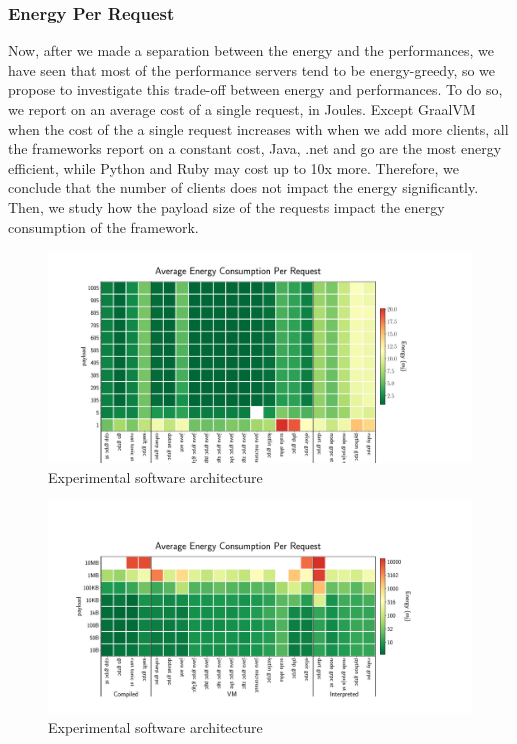 \subsubsection{Energy Per Request}
Now, after we made a separation between the energy and the performances, we have seen that most of the performance servers tend to be energy-greedy, so we propose to investigate this trade-off between energy and performances.
To do so, we report on an average cost of a single request, in Joules.
Except GraalVM when the cost of the a single request increases with when we add more clients, all the frameworks report on a constant cost, Java, .net and go are the most energy efficient, while Python and Ruby may cost up to 10x more.
Therefore, we conclude that the number of clients does not impact the energy significantly.
Then, we study how the payload size of the requests impact the energy consumption of the framework.

\begin{figure}[!hbt]
    \begin{center}
        \includegraphics[width=1.2\linewidth]{imgs/energy_cost_clients}
    \end{center}
    \caption{Experimental software architecture}\label{fig:rpcprotocol}
\end{figure}

\begin{figure}[!hbt]
    \begin{center}
        \includegraphics[width=1.2\linewidth]{imgs/energy_cost_payload}
    \end{center}
    \caption{Experimental software architecture}\label{fig:energy_cost_payload}
\end{figure}


